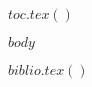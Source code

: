 \documentclass[12pt, b5paper,twoside]{upfthesis}
\begin{document}
\frontmatter

\maketitle

$toc.tex()$

$body$

\backmatter

\printindex

\clearpage

$biblio.tex()$
\end{document}

